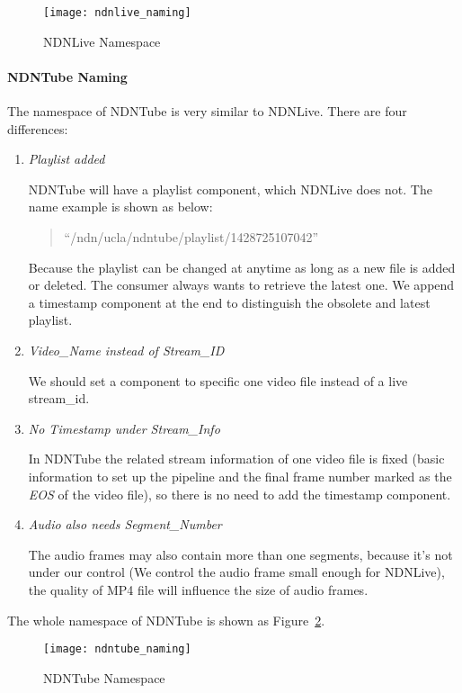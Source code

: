\begin{figure}%
  \centering
  \texttt{[image: ndnlive\_naming]}
  \caption{NDNLive Namespace}
  \label{fig:ndnlive_naming}
\end{figure}
\paragraph{NDNTube Naming} %
\label{par:ndntube_naming}
\vspace{0.3cm}

The namespace of NDNTube is very similar to NDNLive. There are four differences:
\begin{enumerate}
	\item{\textit{Playlist added}} 
		
		NDNTube will have a playlist component, which NDNLive does not. The name example is shown as below: 
		\begin{quote}
		``/ndn/ucla/ndntube/playlist/1428725107042''
		\end{quote}
    Because the playlist can be changed at anytime as long as a new file is added or deleted. The consumer always wants to retrieve the latest one. We append a timestamp component at the end to distinguish the obsolete and latest playlist.

	\item{\textit{Video\_Name instead of Stream\_ID}} 

		We should set a component to specific one video file instead of a live stream\_id.

	\item{\textit{No Timestamp under Stream\_Info}} 

    In NDNTube the related stream information of one video file is fixed (basic information to set up the pipeline and the final frame number marked as the \textit{EOS} of the video file), so there is no need to add the timestamp component.

	\item{\textit{Audio also needs Segment\_Number}} 

    The audio frames may also contain more than one segments, because it's not under our control (We control the audio frame small enough for NDNLive), the quality of MP4 file will influence the size of audio frames.
\end{enumerate}

The whole namespace of NDNTube is shown as Figure~\ref{fig:ndntube_naming}.

\begin{figure}%
  \centering
  \texttt{[image: ndntube\_naming]}
  \caption{NDNTube Namespace}
  \label{fig:ndntube_naming}
\end{figure}

